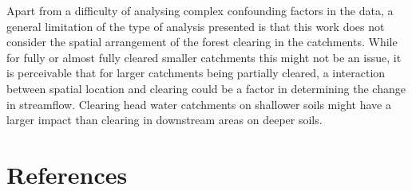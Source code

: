 \documentclass[]{elsarticle} %
\begin{document}
Apart from a difficulty of analysing complex confounding factors in the data, a general limitation of the type of analysis presented is that this work does not consider the spatial arrangement of the forest clearing in the catchments. While for fully or almost fully cleared smaller catchments this might not be an issue, it is perceivable that for larger catchments being partially cleared, a interaction between spatial location and clearing could be a factor in determining the change in streamflow. Clearing head water catchments on shallower soils might have a larger impact than clearing in downstream areas on deeper soils.

\hypertarget{references}{%
\section*{References}\label{references}}
\end{document}
